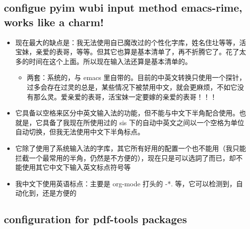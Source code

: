 \documentclass[9pt, b5paper]{article}
\begin{document}
\subsection{configue pyim wubi input method emacs-rime, works like a charm!}
\label{sec:orgc3d9db7}
\begin{itemize}
\item 现在最大的缺点是：我无法使用自已魔改过的个性化字库，姓名住圵等等，活宝妹，亲爱的表哥，等等。但其它也算是基本清单了，再不折腾它了。花了太多的时间在这个上面。所以现在输入法还算是基本清单的。
\begin{itemize}
\item 两套：系统的，与 emacs 里自带的。目前的中英文转换只使用一个探针，过多会存在过灵的总是，某些情况下被禁用中文，就会更麻烦，不如它没有那么灵。爱亲爱的表哥，活宝妹一定要嫁的亲爱的表哥！！！
\end{itemize}
\item 它具备以空格来区分中英文输入法的功能，但不能与中文下半角配合使用。也就是，它具备了我现在所使用过的 sis 下的自动中英文之间以一个空格为单位自动切换，但我无法使用中文下半角标点。
\item 它除了使用了系统输入法的字库，其它所有好用的配置一个也不能用（我只能拦截一个最常用的半角，仍然是不方便的），现在只是可以选詞了而已，却不能使用其它中文下输入英文标点符号等
\item 我中文下使用英语标点：主要是 org-mode 打头的 -*. 等，它可以检测到，自动化到，还是方便的
\end{itemize}
\subsection{configuration for pdf-tools packages}
\label{sec:org439bcfc}
\end{document}

